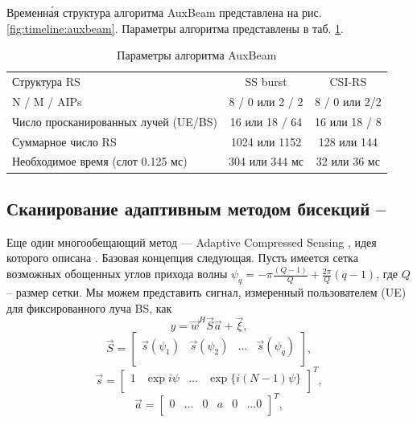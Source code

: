 Временн\'{а}я структура алгоритма AuxBeam представлена на рис. \ref{fig:timeline:auxbeam}. Параметры алгоритма представлены в таб. \ref{tab:parameters:auxbeam}.
\begin{table}
    \centering
    \caption{Параметры алгоритма AuxBeam}
    \label{tab:parameters:auxbeam}
    \begin{tabular}{lcc}
        \toprule
        \midrule
        Структура RS                         & SS burst        & CSI-RS        \\
        N / M / AIPs                         & 8 / 0 или 2 / 2 & 8 / 0 или 2/2 \\
        Число просканированных лучей (UE/BS) & 16 или 18 / 64  & 16 или 18 / 8 \\
        Суммарное число RS                   & 1024 или 1152   & 128 или 144   \\
        Необходимое время (слот 0.125 мс)    & 304 или 344 мс  & 32 или 36 мс  \\
        \hline
    \end{tabular}
\end{table}

\subsection[Сканирование адаптивным методом бисекций]{Сканирование адаптивным методом бисекций -- \ACS}
\label{sec:ACS:singlepath}

Еще один многообещающий метод —  Adaptive Compressed Sensing , идея которого описана \cite{Alkhateeb2014}.
Базовая концепция следующая. Пусть имеется сетка возможных
обощенных углов прихода волны $\psi_q = - \pi\frac{(Q-1)}{Q} + \frac{2\pi}{Q} (q-1)$, где $Q$ -- размер сетки.
Мы можем представить сигнал, измеренный пользователем (UE) для фиксированного
луча BS, как
\begin{equation}
    \label{eq:4.42}
    y = \vec w^H\vec S \vec a + \vec \xi,
\end{equation}
\begin{equation}
    \label{eq:4.43}
    \vec S =
    \begin{bmatrix}
        \vec s(\psi_1) & \vec s(\psi_2) & \dots & \vec s(\psi_q) \\
    \end{bmatrix},
\end{equation}
\begin{equation}
    \label{eq:4.44}
    \vec s =
    \begin{bmatrix}
        1 & \exp{i\psi} & \dots & \exp\{ i(N-1)\psi\} \\
    \end{bmatrix}^T,
\end{equation}
\begin{equation}
    \label{eq:4.45}
    \vec a =
    \begin{bmatrix}
        0 & \dots & 0 & a & 0 & \dots 0 \\
    \end{bmatrix}^T,
\end{equation}

